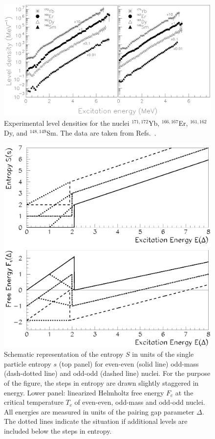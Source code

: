 \clearpage

\begin{figure}
\includegraphics[totalheight=20cm,angle=0,bb=0 20 350 730]{fig1.ps}
\caption{Experimental level densities for the nuclei $^{171,172}$Yb, 
$^{166,167}$Er, $^{161,162}$Dy, and $^{148,149}$Sm. The data are taken from 
Refs.\ \protect\cite{SB01,MG01,SG02}.}
\label{fig:fig1}
\end{figure}

\clearpage

\begin{figure}
\includegraphics[totalheight=20cm,angle=0,bb=0 20 350 730]{fig2.ps}
\caption{Schematic representation of the entropy $S$ in units of the single
particle entropy $s$ (top panel) for even-even (solid line) odd-mass 
(dash-dotted line) and odd-odd (dashed line) nuclei. For the purpose of the 
figure, the steps in entropy are drawn slightly staggered in energy. Lower 
panel: linearized Helmholtz free energy $F_c$ at the critical temperature $T_c$
of even-even, odd-mass and odd-odd nuclei. All energies are measured in units 
of the pairing gap parameter $\Delta$. The dotted lines indicate the situation 
if additional levels are included below the steps in entropy.}
\label{fig:fig2}
\end{figure}

